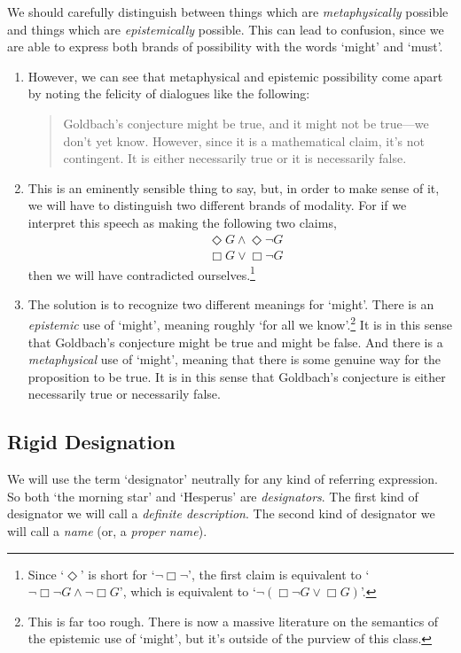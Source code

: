 \documentclass[landscape, two column, full page,reqno]{article}
\newcommand{\qe}{\begin{enumerate}[align=left,style=nextline,leftmargin=17pt,labelsep=5pt,font=\normalfont]}
\newcommand{\ze}{\end{enumerate}}
\newcommand{\p}{\item}
\newcommand{\e}{\emph}
\begin{document}
\p We should carefully distinguish between things which are \e{metaphysically} possible and things which are \e{epistemically} possible.  This can lead to confusion, since we are able to express both brands of possibility with the words `might' and `must'. 
	\qe
	\p   However, we can see that metaphysical and epistemic possibility come apart by noting the felicity of dialogues like the following:
		\begin{quote}
		Goldbach's conjecture might be true, and it might not be true---we don't yet know.  However, since it is a mathematical claim, it's not contingent.  It is either necessarily true or it is necessarily false.
		\end{quote}
	\p This is an eminently sensible thing to say, but, in order to make sense of it, we will have to distinguish two different brands of modality.  For if we interpret this speech as making the following two claims,
			\begin{align*}
			&\Diamond G \wedge \Diamond \neg G		\\
			&\Box G \vee \Box \neg G
			\end{align*}
	then we will have contradicted ourselves.\footnote{ Since `$\Diamond$' is short for `$\neg \Box \neg$', the first claim is equivalent to `$\neg \Box \neg G \wedge \neg \Box G$', which is equivalent to `$\neg( \Box \neg G \vee \Box G)$'.}
	\p The solution is to recognize two different meanings for `might'.  There is an \e{epistemic} use of `might', meaning roughly `for all we know'.\footnote{ This is far too rough.  There is now a massive literature on the semantics of the epistemic use of `might', but it's outside of the purview of this class.}  It is in this sense that Goldbach's conjecture might be true and might be false.  And there is a \e{metaphysical} use of `might', meaning that there is some genuine way for the proposition to be true.  It is in this sense that Goldbach's conjecture is either necessarily true or necessarily false.
	\ze 
	
\subsection{Rigid Designation}	

\p We will use the term `designator' neutrally for any kind of referring expression.  So both `the morning star' and `Hesperus' are \e{designators}.   The first kind of designator we will call a \e{definite description}.  The second kind of designator we will call a \e{name} (or, a \e{proper name}).
\end{document}
